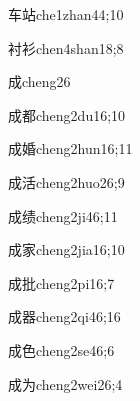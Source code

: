 \begin{verbete}{车站}{che1zhan4}{4;10}
\end{verbete}

\begin{verbete}{衬衫}{chen4shan1}{8;8}
\end{verbete}

\begin{verbete}{成}{cheng2}{6}
\end{verbete}

\begin{verbete}{成都}{cheng2du1}{6;10}
\end{verbete}

\begin{verbete}{成婚}{cheng2hun1}{6;11}
\end{verbete}

\begin{verbete}{成活}{cheng2huo2}{6;9}
\end{verbete}

\begin{verbete}{成绩}{cheng2ji4}{6;11}
\end{verbete}

\begin{verbete}{成家}{cheng2jia1}{6;10}
\end{verbete}

\begin{verbete}{成批}{cheng2pi1}{6;7}
\end{verbete}

\begin{verbete}{成器}{cheng2qi4}{6;16}
\end{verbete}

\begin{verbete}{成色}{cheng2se4}{6;6}
\end{verbete}

\begin{verbete}{成为}{cheng2wei2}{6;4}
\end{verbete}

